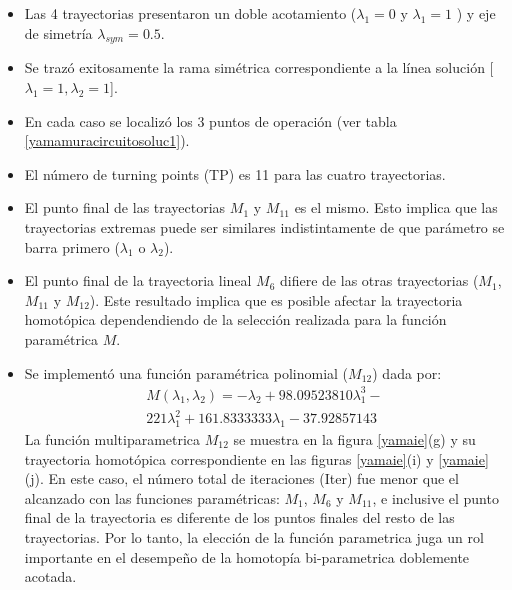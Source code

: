 \documentclass[conference,letterpaper,twocolumn]{IEEEtran}
\begin{document}
\begin{itemize}
\item Las 4 trayectorias presentaron un doble acotamiento ($\lambda_1=0$ y $\lambda_1=1$ )  y eje de simetría $\lambda_{sym}=0.5$.
\item Se trazó exitosamente la rama simétrica correspondiente a la línea solución [$\lambda_1=1,\lambda_2=1$].
\item En cada caso se localizó los 3 puntos de operación (ver tabla \ref{yamamuracircuitosoluc1}).
\item El número de turning points (TP) es  11 para las cuatro trayectorias.
\item El punto final de las trayectorias $M_1$ y $M_{11}$ es el mismo. Esto implica
que las trayectorias extremas puede ser similares indistintamente de que parámetro se
barra primero ($\lambda_1$ o $\lambda_2$).
\item El punto final de la trayectoria lineal $M_{6}$ difiere de las otras trayectorias ($M_1$, $M_11$ y $M_{12}$).
Este resultado implica que es posible afectar la trayectoria homot\'opica dependendiendo
de la selección realizada para la función paramétrica $M$.
\item Se implementó una función  paramétrica polinomial ($M_{12}$) dada por: 
{\small
\begin{displaymath}
\begin{array}{c}
M(\lambda_1,\lambda_2)=-\lambda_2+ 98.09523810\lambda_1^3- \\ 221\lambda_1^2+ 161.8333333\lambda_1-37.92857143
\end{array}
\end{displaymath}
}
La función multiparametrica $M_{12}$ se muestra en la figura \ref{yamaie}(g) y su trayectoria
homotópica correspondiente en las figuras \ref{yamaie}(i) y \ref{yamaie}(j). En este caso,
el número total de iteraciones (Iter) fue menor que el alcanzado con las funciones paramétricas: $M_1$, $M_6$ y $M_{11}$,
e inclusive el punto final de la trayectoria es diferente de los puntos finales del resto de las trayectorias. Por lo tanto, la elección de la función parametrica juga un rol importante en el desempeño de la homotopía bi-parametrica doblemente acotada.
\end{itemize}
\end{document}
